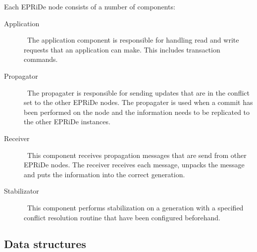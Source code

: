 Each EPRiDe node consists of a number of components:

\begin{description}
	\item[Application] \
		The application component is responsible for handling read and write requests that an application can make. This includes transaction commands.
		
	\item[Propagator] \
		The propagater is responsible for sending updates that are in the conflict set to the other EPRiDe nodes. The propagater is used  when a commit has been performed on the node and the information needs to be replicated to the other EPRiDe instances.
		
	\item[Receiver] \
		This component receives propagation messages that are send from other EPRiDe nodes. The receiver receives each message, unpacks the message and puts the information into the correct generation.
		
	\item[Stabilizator] \
		This component performs stabilization on a generation with a specified conflict resolution routine that have been configured beforehand.
\end{description}


\subsection{Data structures} %
\label{sub:datastructures}

